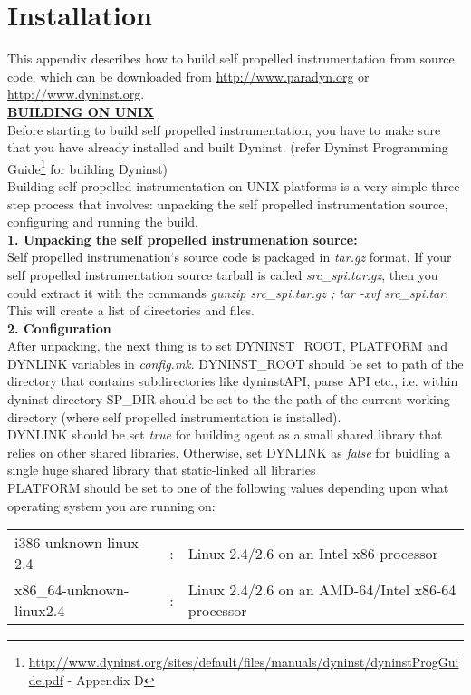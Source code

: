 \section{Installation}
This appendix describes how to build self propelled instrumentation from source code, which can be downloaded from \url{http://www.paradyn.org} or \url{http://www.dyninst.org}. \\

\underline{\textbf{BUILDING ON UNIX}}	\\
Before starting to build self propelled instrumentation, you have to make sure that you have already installed and built Dyninst. (refer Dyninst Programming Guide\footnote{\url{http://www.dyninst.org/sites/default/files/manuals/dyninst/dyninstProgGuide.pdf} - Appendix D} for building Dyninst) \\

Building self propelled instrumentation on UNIX platforms is a very simple three step process that involves: unpacking the self propelled instrumentation source, configuring and running the build. \\

\textbf{1. Unpacking the self propelled instrumenation source:} \\
Self propelled instrumenation`s source code is packaged in \textit{tar.gz} format. If your self propelled instrumentation source tarball is called \textit{src\_spi.tar.gz}, then you could extract it with the commands \textit{gunzip src\_spi.tar.gz ; tar  -xvf src\_spi.tar}. This will create a list of directories and files.  \\

\textbf{2. Configuration} \\
After unpacking, the next thing is to set DYNINST\_ROOT, PLATFORM and DYNLINK variables in \textit{config.mk}.  DYNINST\_ROOT should be set to path of the directory that contains subdirectories like dyninstAPI, parse API etc.,  i.e. within dyninst directory SP\_DIR should be set to the the path of the current working directory (where self propelled instrumentation is installed). \\
DYNLINK should be set \textit{true} for building agent as a small shared library that relies on other shared libraries. Otherwise, set DYNLINK as \textit{false} for buidling a single huge shared library that static-linked all libraries \\
PLATFORM should be set to one of the following values depending upon what operating system you are running on: \\
\begin{table}[h]
\begin{tabular}{l c l}
 i386-unknown-linux 2.4  & : & Linux 2.4/2.6 on an Intel x86 processor \\
 x86\_64-unknown-linux2.4&: &Linux 2.4/2.6 on an AMD-64/Intel x86-64  processor \\
\end{tabular}
\end{table}

